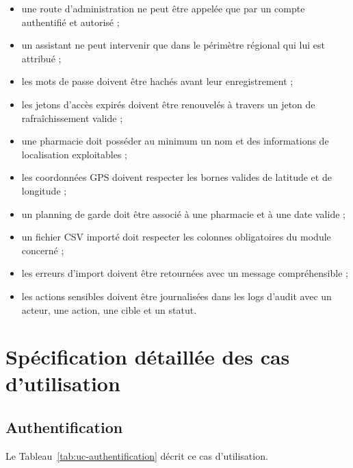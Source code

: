\begin{itemize}
    \item une route d'administration ne peut être appelée que par un compte authentifié et autorisé ;
    \item un assistant ne peut intervenir que dans le périmètre régional qui lui est attribué ;
    \item les mots de passe doivent être hachés avant leur enregistrement ;
    \item les jetons d'accès expirés doivent être renouvelés à travers un jeton de rafraîchissement valide ;
    \item une pharmacie doit posséder au minimum un nom et des informations de localisation exploitables ;
    \item les coordonnées GPS doivent respecter les bornes valides de latitude et de longitude ;
    \item un planning de garde doit être associé à une pharmacie et à une date valide ;
    \item un fichier CSV importé doit respecter les colonnes obligatoires du module concerné ;
    \item les erreurs d'import doivent être retournées avec un message compréhensible ;
    \item les actions sensibles doivent être journalisées dans les logs d'audit avec un acteur, une action, une cible et un statut.
\end{itemize}

\section{Spécification détaillée des cas d'utilisation}

\subsection{Authentification}

Le Tableau~\ref{tab:uc-authentification} décrit ce cas d'utilisation.

